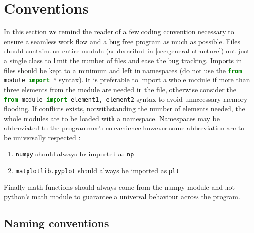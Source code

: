 \documentclass[]{article}
\begin{document}
\section{Conventions}\label{sec:conventions}

In this section we remind the reader of a few coding convention necessary to ensure a seamless work flow and a bug free program as much as possible.
Files should contains an entire module (as described in \ref{sec:general-structure}) not just a single class to limit the number of files and ease the bug tracking.
Imports in files should be kept to a minimum and left in namespaces (do not use the \lstinline[columns=fixed,language=Python]|from module import *| syntax). It is preferable to import a whole module if more than three elements from the module are needed in the file, otherwise consider the \lstinline[columns=fixed,language=Python]|from module import element1, element2| syntax to avoid unnecessary memory flooding. If conflicts exists, notwithstanding the number of elements needed, the whole modules are to be loaded with a namespace.
Namespaces may be abbreviated to the programmer's convenience however some abbreviation are to be universally respected :
\begin{enumerate}[label=(\roman*)]
	\item \texttt{numpy} should always be imported as \texttt{np}
	\item \texttt{matplotlib.pyplot} should always be imported as \texttt{plt}
\end{enumerate}

Finally math functions should always come from the numpy module and not python's math module to guarantee a universal behaviour across the program.

\subsection{Naming conventions}\label{sec:naming-conventions}
\end{document}
